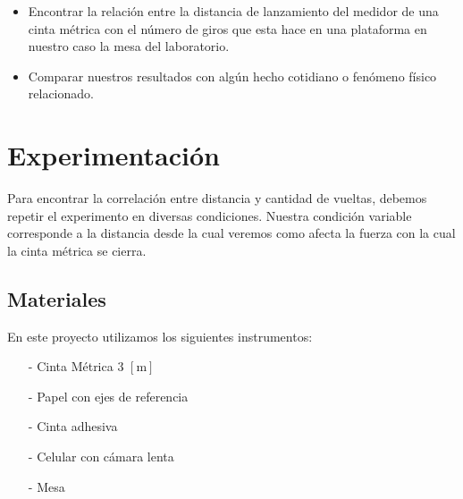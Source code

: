 \documentclass{article}
\begin{document}
\begin{itemize}
    \item Encontrar la relación entre la distancia de lanzamiento del medidor de una cinta métrica con el número de giros que esta hace en una plataforma en nuestro caso la mesa del laboratorio.
    \item Comparar nuestros resultados con algún hecho cotidiano o fenómeno físico relacionado. %
\end{itemize}


    



\section{Experimentación}
Para encontrar la correlación entre distancia y cantidad de vueltas, debemos repetir el experimento en diversas condiciones. Nuestra condición variable corresponde a la distancia desde la cual veremos como afecta la fuerza con la cual la cinta métrica se cierra.

\subsection{Materiales}
En este proyecto utilizamos los siguientes instrumentos:

\begin{itemize}
    \item[-] Cinta Métrica 3 $[\text{m}]$
    \item[-] Papel con ejes de referencia
    \item[-] Cinta adhesiva
    \item[-] Celular con cámara lenta
    \item[-] Mesa
\end{itemize}
    
\end{document}
